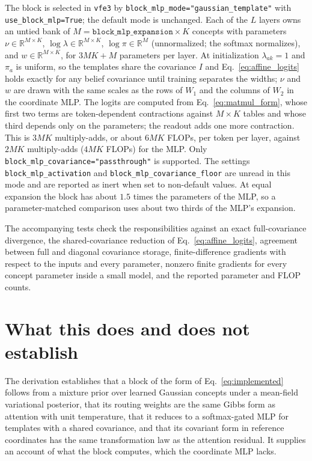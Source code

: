 \documentclass[11pt]{article}
\theoremstyle{definition}
\theoremstyle{remark}
\begin{document}
The block is selected in \texttt{vfe3} by \texttt{block\_mlp\_mode="gaussian\_template"} with \texttt{use\_block\_mlp=True}; the default mode is unchanged. Each of the $L$ layers owns an untied bank of $M=\texttt{block\_mlp\_expansion}\times K$ concepts with parameters $\nu\in\mathbb{R}^{M\times K}$, $\log\lambda\in\mathbb{R}^{M\times K}$, $\log\pi\in\mathbb{R}^{M}$ (unnormalized; the softmax normalizes), and $w\in\mathbb{R}^{M\times K}$, for $3MK+M$ parameters per layer. At initialization $\lambda_{ak}=1$ and $\pi_a$ is uniform, so the templates share the covariance $I$ and Eq.~\eqref{eq:affine_logits} holds exactly for any belief covariance until training separates the widths; $\nu$ and $w$ are drawn with the same scales as the rows of $W_1$ and the columns of $W_2$ in the coordinate MLP. The logits are computed from Eq.~\eqref{eq:matmul_form}, whose first two terms are token-dependent contractions against $M\times K$ tables and whose third depends only on the parameters; the readout adds one more contraction. This is $3MK$ multiply-adds, or about $6MK$ FLOPs, per token per layer, against $2MK$ multiply-adds ($4MK$ FLOPs) for the MLP. Only \texttt{block\_mlp\_covariance="passthrough"} is supported. The settings \texttt{block\_mlp\_activation} and \texttt{block\_mlp\_covariance\_floor} are unread in this mode and are reported as inert when set to non-default values. At equal expansion the block has about $1.5$ times the parameters of the MLP, so a parameter-matched comparison uses about two thirds of the MLP's expansion.

The accompanying tests check the responsibilities against an exact full-covariance divergence, the shared-covariance reduction of Eq.~\eqref{eq:affine_logits}, agreement between full and diagonal covariance storage, finite-difference gradients with respect to the inputs and every parameter, nonzero finite gradients for every concept parameter inside a small model, and the reported parameter and FLOP counts.

\section{What this does and does not establish}

The derivation establishes that a block of the form of Eq.~\eqref{eq:implemented} follows from a mixture prior over learned Gaussian concepts under a mean-field variational posterior, that its routing weights are the same Gibbs form as attention with unit temperature, that it reduces to a softmax-gated MLP for templates with a shared covariance, and that its covariant form in reference coordinates has the same transformation law as the attention residual. It supplies an account of what the block computes, which the coordinate MLP lacks.
\end{document}
